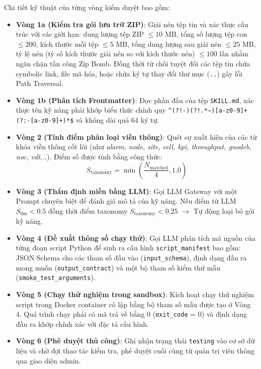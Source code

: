 \documentclass[12pt,a4paper]{article}
\begin{document}
Chi tiết kỹ thuật của từng vòng kiểm duyệt bao gồm:
\begin{itemize}
    \item \textbf{Vòng 1a (Kiểm tra gói lưu trữ ZIP)}: Giải nén tệp tin và xác thực cấu trúc với các giới hạn: dung lượng tệp ZIP $\le 10$ MB, tổng số lượng tệp con $\le 200$, kích thước mỗi tệp $\le 5$ MB, tổng dung lượng sau giải nén $\le 25$ MB, tỷ lệ nén (tỷ số kích thước giải nén so với kích thước nén) $\le 100$ lần nhằm ngăn chặn tấn công Zip Bomb. Đồng thời từ chối tuyệt đối các tệp tin chứa symbolic link, file mã hóa, hoặc chứa ký tự thay đổi thư mục (\texttt{..}) gây lỗi Path Traversal.
    \item \textbf{Vòng 1b (Phân tích Frontmatter)}: Đọc phần đầu của tệp \texttt{SKILL.md}, xác thực tên kỹ năng phải khớp biểu thức chính quy \texttt{\^{}(?!-)(?!.*--)[a-z0-9]+(?:-[a-z0-9]+)*\$} và không dài quá 64 ký tự.
    \item \textbf{Vòng 2 (Tính điểm phân loại viễn thông)}: Quét sự xuất hiện của các từ khóa viễn thông cốt lõi (như \textit{alarm, node, site, cell, kpi, throughput, gnodeb, noc, vdt...}). Điểm số được tính bằng công thức:
    \begin{equation}
        S_{\text{taxonomy}} = \min\left(\frac{N_{\text{matched}}}{4}, 1.0\right)
    \end{equation}
    \item \textbf{Vòng 3 (Thẩm định miền bằng LLM)}: Gọi LLM Gateway với một Prompt chuyên biệt để đánh giá mô tả của kỹ năng. Nếu điểm từ LLM $S_{\text{llm}} < 0.5$ đồng thời điểm taxonomy $S_{\text{taxonomy}} < 0.25$ $\to$ Tự động loại bỏ gói kỹ năng.
    \item \textbf{Vòng 4 (Đề xuất thông số chạy thử)}: Gọi LLM phân tích mã nguồn của từng đoạn script Python để sinh ra cấu hình \texttt{script\_manifest} bao gồm: JSON Schema cho các tham số đầu vào (\texttt{input\_schema}), định dạng đầu ra mong muốn (\texttt{output\_contract}) và một bộ tham số kiểm thử mẫu (\texttt{smoke\_test\_arguments}).
    \item \textbf{Vòng 5 (Chạy thử nghiệm trong sandbox)}: Kích hoạt chạy thử nghiệm script trong Docker container cô lập bằng bộ tham số mẫu được tạo ở Vòng 4. Quá trình chạy phải có mã trả về bằng 0 (\texttt{exit\_code} = 0) và định dạng đầu ra khớp chính xác với đặc tả cấu hình.
    \item \textbf{Vòng 6 (Phê duyệt thủ công)}: Ghi nhận trạng thái \texttt{testing} vào cơ sở dữ liệu và chờ đợi thao tác kiểm tra, phê duyệt cuối cùng từ quản trị viên thông qua giao diện admin.
\end{itemize}
\end{document}
